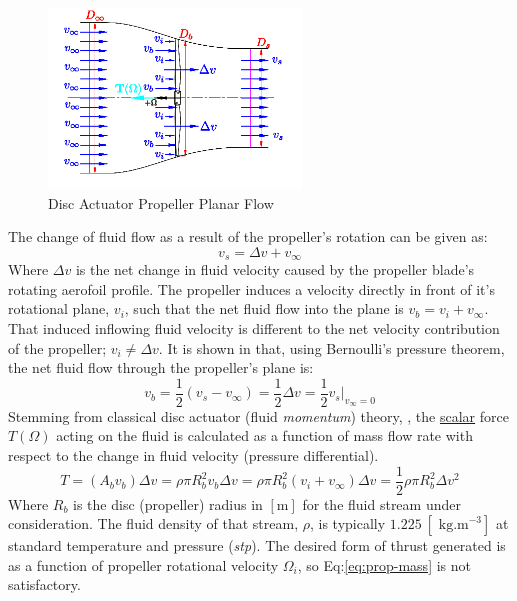 \begin{figure}[htbp]
\centering
\includegraphics[width=0.6\textwidth]{figs/bem-flow}
\caption{Disc Actuator Propeller Planar Flow}
\label{fig:bem-flow}
\vspace{-15pt}
\end{figure}
\par
The change of fluid flow as a result of the propeller's rotation can be given as:
\begin{equation}
v_s = \Delta v + v_\infty
\end{equation}
Where $\Delta v$ is the net change in fluid velocity caused by the propeller blade's rotating aerofoil profile. The propeller induces a velocity directly in front of it's rotational plane, $v_i$, such that the net fluid flow into the plane is $v_b=v_i+v_\infty$. That induced inflowing fluid velocity is different to the net velocity contribution of the propeller; $v_i\not=\Delta v$. It is shown in \cite{bladesforquadrotors} that, using Bernoulli's pressure theorem, the net fluid flow through the propeller's plane is:
\begin{equation}\label{eq:bernoulli}
v_b = \frac{1}{2} ( v_s - v_{\infty} ) = \frac{1}{2} \Delta v = \frac{1}{2} v_s \big|_{v_\infty=0}
\end{equation}
\newpage
Stemming from classical disc actuator (fluid \emph{momentum}) theory, \cite{fluidmomentum}, the \underline{scalar} force $T(\Omega)$ acting on the fluid is calculated as a function of mass flow rate with respect to the change in fluid velocity (pressure differential).
\begin{equation}\label{eq:prop-mass}
T=(A_b v_b)\Delta v = \rho \pi R_b^2v_b \Delta v = \rho \pi R_b^2(v_i+v_\infty)\Delta v = \frac{1}{2} \rho \pi R_b^2 \Delta v^2
\end{equation}
Where $R_b$ is the disc (propeller) radius in $[\text{m}]$ for the fluid stream under consideration. The fluid density of that stream, $\rho$, is typically $1.225~[\text{ kg.m}^{-3}]$ at standard temperature and pressure (\emph{stp}). The desired form of thrust generated is as a function of propeller rotational velocity $\Omega_i$, so Eq:\ref{eq:prop-mass} is not satisfactory. 
